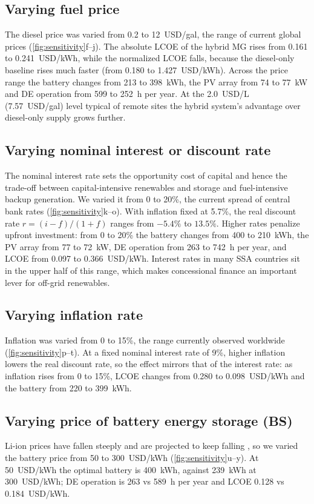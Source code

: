 \documentclass[final,3p,times]{elsarticle}
\begin{document}
\subsection{Varying fuel price}
The diesel price was varied from 0.2 to 12~USD/gal, the range of current global prices \cite{diesel_price} (\cref{fig:sensitivity}f--j). The absolute LCOE of the hybrid MG rises from 0.161 to 0.241~USD/kWh, while the normalized LCOE falls, because the diesel-only baseline rises much faster (from 0.180 to 1.427~USD/kWh). Across the price range the battery changes from 213 to 398~kWh, the PV array from 74 to 77~kW and DE operation from 599 to 252~h per year. At the 2.0~USD/L (7.57~USD/gal) level typical of remote sites the hybrid system's advantage over diesel-only supply grows further.


\subsection{\label{sec:varyInterest} Varying nominal interest or discount rate}
The nominal interest rate sets the opportunity cost of capital and hence the trade-off between capital-intensive renewables and storage and fuel-intensive backup generation. We varied it from 0 to 20\%, the current spread of central bank rates \cite{interest_rates} (\cref{fig:sensitivity}k--o). With inflation fixed at 5.7\%, the real discount rate $r = (i - f)/(1 + f)$ ranges from $-5.4\%$ to $13.5\%$. Higher rates penalize upfront investment: from 0 to 20\% the battery changes from 400 to 210~kWh, the PV array from 77 to 72~kW, DE operation from 263 to 742~h per year, and LCOE from 0.097 to 0.366~USD/kWh. Interest rates in many SSA countries sit in the upper half of this range, which makes concessional finance an important lever for off-grid renewables.


\subsection{Varying inflation rate}
Inflation was varied from 0 to 15\%, the range currently observed worldwide \cite{inflation_rate} (\cref{fig:sensitivity}p--t). At a fixed nominal interest rate of 9\%, higher inflation lowers the real discount rate, so the effect mirrors that of the interest rate: as inflation rises from 0 to 15\%, LCOE changes from 0.280 to 0.098~USD/kWh and the battery from 220 to 399~kWh.


\subsection{Varying price of battery energy storage (BS)}
Li-ion prices have fallen steeply and are projected to keep falling \cite{bnef}, so we varied the battery price from 50 to 300~USD/kWh (\cref{fig:sensitivity}u--y). At 50~USD/kWh the optimal battery is 400~kWh, against 239~kWh at 300~USD/kWh; DE operation is 263 vs 589~h per year and LCOE 0.128 vs 0.184~USD/kWh.
\end{document}

